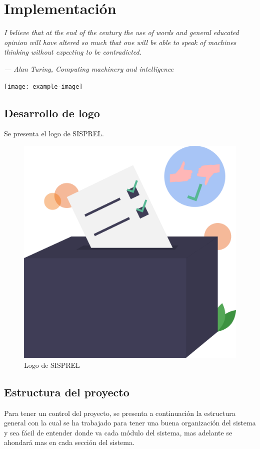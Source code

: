 \chapter{Implementación} 
\epigraph{\textit{I believe that at the end of the century the use of words and general educated opinion will have altered so much that one will be able to speak of machines thinking without expecting to be contradicted.     
	}}{\textit{—  Alan Turing, Computing machinery and intelligence}}
	\vspace*{8cm}
	\begin{center}
		\centering
		\texttt{[image: example-image]}
	\end{center}
	\thispagestyle{empty}
	\newpage
\vspace*{2cm}

\section{Desarrollo de logo}
Se presenta el logo de SISPREL.
\begin{figure}[!htb]
    \centering
    \includegraphics[scale=0.25]{TT/img/sisprel.png}
    \caption{Logo de SISPREL}
    \label{graphic:SISPRELLogo}    
\end{figure}

\section{Estructura del proyecto}
Para tener un control del proyecto, se presenta a continuación la estructura general con la cual se ha trabajado para tener una buena organización del sistema y sea fácil de entender donde va cada módulo del sistema, mas adelante se ahondará mas en cada sección del sistema.


